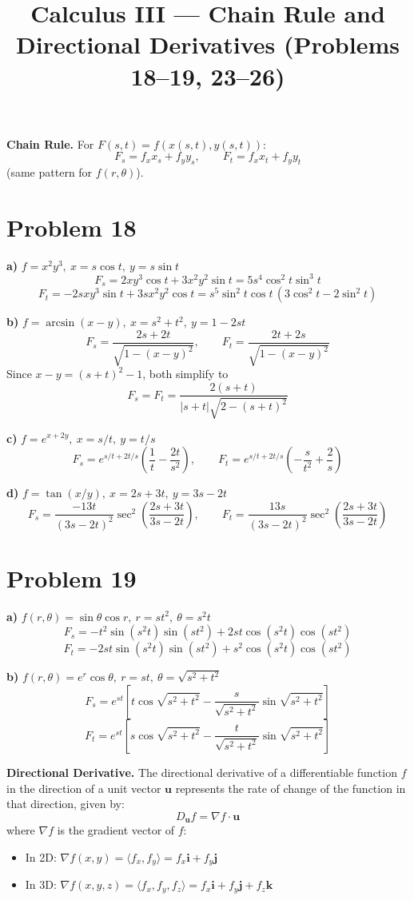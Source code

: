 \documentclass[11pt]{article}
\title{Calculus III --- Chain Rule and Directional Derivatives (Problems 18--19, 23--26)}
\author{}
\date{}
\begin{document}
\maketitle

\textbf{Chain Rule.} For $F(s,t)=f(x(s,t),y(s,t))$:
\[
F_s = f_x x_s + f_y y_s, \qquad F_t = f_x x_t + f_y y_t
\]
(same pattern for $f(r,\theta)$).

\hrulefill

\section*{Problem 18}

\textbf{a)} $f=x^2y^3,\ x=s\cos t,\ y=s\sin t$
\[
F_s = 2xy^3\cos t + 3x^2y^2\sin t = 5s^4\cos^2 t\sin^3 t
\]
\[
F_t = -2sxy^3\sin t + 3sx^2y^2\cos t = s^5\sin^2 t\cos t\,(3\cos^2 t-2\sin^2 t)
\]

\textbf{b)} $f=\arcsin(x-y),\ x=s^2+t^2,\ y=1-2st$
\[
F_s=\frac{2s+2t}{\sqrt{1-(x-y)^2}}, \qquad F_t=\frac{2t+2s}{\sqrt{1-(x-y)^2}}
\]
Since $x-y=(s+t)^2-1$, both simplify to
\[
F_s=F_t=\frac{2(s+t)}{|s+t|\sqrt{2-(s+t)^2}}
\]

\textbf{c)} $f=e^{x+2y},\ x=s/t,\ y=t/s$
\[
F_s = e^{s/t+2t/s}\left(\frac1t-\frac{2t}{s^2}\right), \qquad
F_t = e^{s/t+2t/s}\left(-\frac{s}{t^2}+\frac2s\right)
\]

\textbf{d)} $f=\tan(x/y),\ x=2s+3t,\ y=3s-2t$
\[
F_s = \frac{-13t}{(3s-2t)^2}\sec^2\!\left(\frac{2s+3t}{3s-2t}\right), \qquad
F_t = \frac{13s}{(3s-2t)^2}\sec^2\!\left(\frac{2s+3t}{3s-2t}\right)
\]

\newpage
\section*{Problem 19}

\textbf{a)} $f(r,\theta)=\sin\theta\cos r,\ r=st^2,\ \theta=s^2t$
\[
F_s = -t^2\sin(s^2t)\sin(st^2) + 2st\cos(s^2t)\cos(st^2)
\]
\[
F_t = -2st\sin(s^2t)\sin(st^2) + s^2\cos(s^2t)\cos(st^2)
\]

\textbf{b)} $f(r,\theta)=e^r\cos\theta,\ r=st,\ \theta=\sqrt{s^2+t^2}$
\[
F_s = e^{st}\left[t\cos\sqrt{s^2+t^2} - \frac{s}{\sqrt{s^2+t^2}}\sin\sqrt{s^2+t^2}\right]
\]
\[
F_t = e^{st}\left[s\cos\sqrt{s^2+t^2} - \frac{t}{\sqrt{s^2+t^2}}\sin\sqrt{s^2+t^2}\right]
\]
\newpage 

\textbf{Directional Derivative.} The directional derivative of a differentiable function $f$ in the direction of a unit vector $\mathbf{u}$ represents the rate of change of the function in that direction, given by:
\[
D_{\mathbf{u}}f = \nabla f \cdot \mathbf{u}
\]
where $\nabla f$ is the gradient vector of $f$:
\begin{itemize}
    \item In 2D: $\nabla f(x,y) = \langle f_x, f_y \rangle = f_x\mathbf{i} + f_y\mathbf{j}$
    \item In 3D: $\nabla f(x,y,z) = \langle f_x, f_y, f_z \rangle = f_x\mathbf{i} + f_y\mathbf{j} + f_z\mathbf{k}$
\end{itemize}
\end{document}

